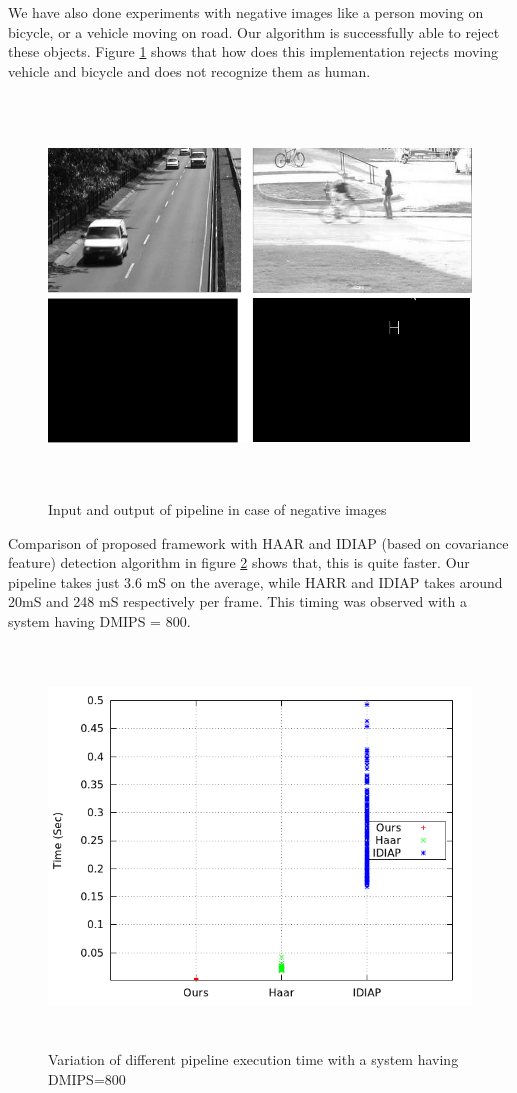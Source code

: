 \indent We have also done experiments with negative images like a person
moving on bicycle, or a vehicle moving on road. Our algorithm is
successfully able to reject these objects. Figure \ref{negative_inputs}
shows that how does this implementation rejects moving vehicle and
bicycle and  does not recognize them as human.
\begin{figure}[!b]
\centering
\includegraphics[height=300pt]{Figures/negative_inputs}
\caption{Input and output of pipeline in case of negative images}
\label{negative_inputs}
\end{figure}


\indent Comparison of proposed framework with HAAR and IDIAP (based on
covariance feature) detection algorithm in figure
\ref{pipeline_execution_time} shows that, this is quite faster. Our
pipeline takes just 3.6 mS on the average, while HARR and IDIAP takes
around 20mS and 248 mS respectively per frame. This timing was observed
with a system having DMIPS = 800.

\begin{figure}[!b]
\centering
\includegraphics[height=300pt]{Figures/pipeline_execution_time}
\caption{Variation of different pipeline execution time with a system
having DMIPS=800}
\label{pipeline_execution_time}
\end{figure}

